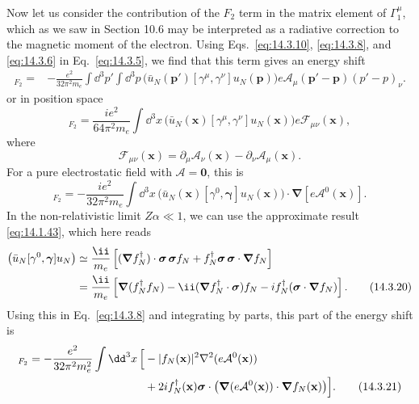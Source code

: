 Now let us consider the contribution of the $F_2$ term in the matrix element
of $\Gamma_1^\mu$, which as we saw in Section 10.6 may be interpreted as a
radiative correction to the magnetic moment of the electron. Using
Eqs.~\eqref{eq:14.3.10}, \eqref{eq:14.3.8}, and \eqref{eq:14.3.6} in
Eq.~\eqref{eq:14.3.5}, we find that this term gives an energy shift
\begin{align}
[\delta E_N]_{F_2}={}&-\frac{e^2}{32\pi^2m_e}\int \dd^3p'\int \dd^3p\,
\bigl(\bar u_N(\mathbf p')[\gamma^\mu,\gamma^\nu]u_N(\mathbf p)\bigr)
e\mathcal A_\mu(\mathbf p'-\mathbf p)(p'-p)_\nu.
\tag{14.3.16}\label{eq:14.3.16}
\end{align}
or in position space
\begin{equation}
[\delta E_N]_{F_2}=\frac{ie^2}{64\pi^2m_e}\int \dd^3x\,
\bigl(\bar u_N(\mathbf x)[\gamma^\mu,\gamma^\nu]u_N(\mathbf x)\bigr)
e\mathcal F_{\mu\nu}(\mathbf x),
\tag{14.3.17}\label{eq:14.3.17}
\end{equation}
where
\begin{equation}
\mathcal F_{\mu\nu}(\mathbf x)
=\partial_\mu\mathcal A_\nu(\mathbf x)-\partial_\nu\mathcal A_\mu(\mathbf x).
\tag{14.3.18}\label{eq:14.3.18}
\end{equation}
For a pure electrostatic field with $\boldsymbol{\mathcal A}= \mathbf{0}$, this is
\begin{equation}
[\delta E_N]_{F_2}=-\frac{ie^2}{32\pi^2m_e}\int \dd^3x\,
\bigl(\bar u_N(\mathbf x)[\gamma^0,\boldsymbol\gamma]u_N(\mathbf x)\bigr)
\cdot\boldsymbol\nabla[e\mathcal A^0(\mathbf x)].
\tag{14.3.19}\label{eq:14.3.19}
\end{equation}
In the non-relativistic limit $Z\alpha\ll1$, we can use the approximate result
\eqref{eq:14.1.43}, which here reads
\begin{align}
\bigl(\bar u_N[\gamma^0,\boldsymbol\gamma]u_N\bigr)
&\simeq\frac{\ii}{m_e}\left[(\boldsymbol\nabla f_N^\dagger)
\cdot\boldsymbol\sigma\,\boldsymbol\sigma f_N
+f_N^\dagger\boldsymbol\sigma\,\boldsymbol\sigma
\cdot\boldsymbol\nabla f_N\right]\notag\\
&=\frac{\ii}{m_e}\left[\boldsymbol\nabla(f_N^\dagger f_N)
-\ii(\boldsymbol\nabla f_N^\dagger\mathbin{\cdot}\boldsymbol\sigma)f_N
-if_N^\dagger(\boldsymbol\sigma\mathbin{\cdot}\boldsymbol\nabla f_N)\right].
\tag{14.3.20}\label{eq:14.3.20}
\end{align}
Using this in Eq.~\eqref{eq:14.3.8} and integrating by parts, this part of the
energy shift is
\begin{align}
[\delta E_N]_{F_2}=-\frac{e^2}{32\pi^2m_e^2}\int \dd^3x\,
\Bigl[&-|f_N(\mathbf x)|^2\nabla^2(e\mathcal A^0(\mathbf x))\notag\\
&+2if_N^\dagger(\mathbf x)\boldsymbol\sigma\cdot
\bigl(\boldsymbol\nabla(e\mathcal A^0(\mathbf x))
\mathbin{\cdot}\boldsymbol\nabla f_N(\mathbf x)\bigr)\Bigr].
\tag{14.3.21}\label{eq:14.3.21}
\end{align}
